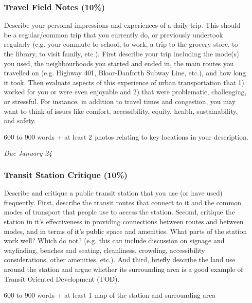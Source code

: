 \documentclass[11pt]{article}
\begin{document}
	
	\subsubsection*{Travel Field Notes (10\%)}
	
	Describe your personal impressions and experiences of a daily trip. This should be a regular/common trip that you currently do, or previously undertook regularly (e.g. your commute to school, to work, a trip to the grocery store, to the library, to visit family, etc.). First describe your trip including the mode(s) you used, the neighbourhoods you started and ended in, the main routes you travelled on (e.g. Highway 401, Bloor-Danforth Subway Line, etc.), and how long it took.
	Then evaluate aspects of this experience of urban transportation that 1) worked for you or were even enjoyable and 2) that were problematic, challenging, or stressful. For instance, in addition to travel times and congestion, you may want to think of issues like comfort, accessibility, equity, health, sustainability, and safety.	
	
	600 to 900 words + at least 2 photos relating to key locations in your description.
	
	\textit{Due January 24}
	
	
	
	
	\subsubsection*{Transit Station Critique (10\%)}
	
	Describe and critique a public transit station that you use (or have used) frequently. First, describe the transit routes that connect to it and the common modes of transport that people use to access the station. Second, critique the station in it's effectiveness in providing connections between routes and between modes, and in terms of it's public space and amenities. What parts of the station work well? Which do not? (e.g. this can include discussion on signage and wayfinding, benches and seating, cleanliness, crowding, accessibility considerations, other amenities, etc.). And third, briefly describe the land use around the station and argue whether its surrounding area is a good example of Transit Oriented Development (TOD). 
	
	600 to 900 words + at least 1 map of the station and surrounding area
	
\end{document}
